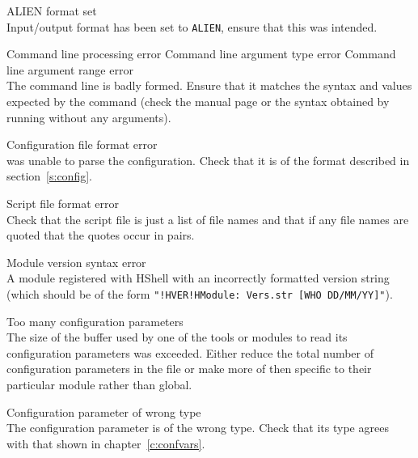 \begin{itemize}
\begin{itemize}
\end{itemize}


\begin{itemize}

    ALIEN format set\\
        Input/output format has been set to \texttt{ALIEN}, ensure that 
        this was intended.

\end{itemize}


\begin{itemize}
    Command line processing error
    Command line argument type error
    Command line argument range error\\
        The command line is badly formed.  Ensure that it matches the 
        syntax and values expected by the command (check the manual 
        page or the syntax obtained by running  without any
        arguments).

    Configuration file format error\\
         was unable to parse the configuration. Check that
        it is of the format described in section~\ref{s:config}.

    Script file format error\\
        Check that the script file is just a list of file names and that
        if any file names are quoted that the quotes occur in pairs.

    Module version syntax error\\
        A module registered with HShell with an incorrectly formatted
        version string (which should be of the form
        \texttt{"!HVER!HModule: Vers.str [WHO DD/MM/YY]"}).

    Too many configuration parameters\\
        The size of the buffer used by one of the tools or modules to read
        its configuration parameters was exceeded.  Either reduce the total
        number of configuration parameters in the file or make more of then
        specific to their particular module rather than global.

    Configuration parameter of wrong type\\
        The configuration parameter is of the wrong type.  Check that its type 
        agrees with that shown in chapter~\ref{c:confvars}.


\end{itemize}
\end{itemize}
